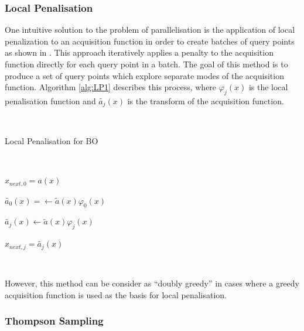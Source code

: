 \documentclass{article}
\begin{document}
		\subsubsection{Local Penalisation}

			One intuitive solution to the problem of parallelisation is the application of local penalization to an acquisition function in order to create batches of query points as shown in \cite{37}. This approach iteratively applies a penalty to the acquisition function directly for each query point in a batch. The goal of this method is to produce a set of query points which explore separate modes of the acquisition function. Algorithm \ref{alg:LP1} describes this process, where \(\varphi_j(x)\) is the local penalisation function and \(\widetilde{a_j}(x)\) is the transform of the acquisition function.
			
			\par \(~\)

			\begin{algorithm}[H]\label{alg:LP1}
			\caption{Local Penalisation for BO}
			\SetAlgoLined
			\
			\

		  	\(x_{next,0} = a(x)\)\;

		  	\(\widetilde{a_0}(x) = \leftarrow \widetilde{a}(x)\varphi_{0}(x)\)\;


			{
				\(\widetilde{a_j}(x) \leftarrow \widetilde{a}(x)\varphi_{j}(x)\)\;

			  	\(x_{next,j} = \widetilde{a_j}(x)\)\;

			}

			
			\end{algorithm}

			\par \(~\)

			However, this method can be consider as “doubly greedy” \cite{36} in cases where a greedy acquisition function is used as the basis for local penalisation.




		\subsubsection{Thompson Sampling}
\end{document}
